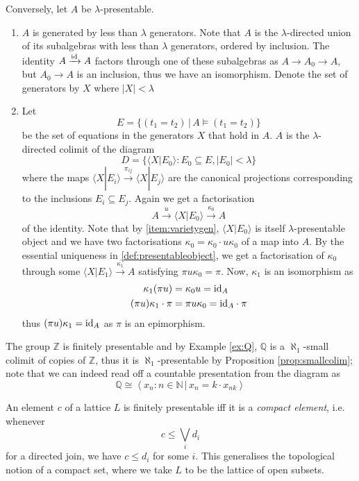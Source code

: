 Conversely, let $A$ be $\lambda$-presentable.
\begin{enumerate}
\item \label{item:varietygen} $A$ is generated by less than $\lambda$ generators. Note that $A$ is the $\lambda$-directed union of its subalgebras with less than $\lambda$ generators, ordered by inclusion. The identity $A \xrightarrow{\textrm{id}} A$ factors through one of these subalgebras as $A \to A_0 \to A$, but $A_0 \to A$ is an inclusion, thus we have an isomorphism. Denote the set of generators by $X$ where $|X| < \lambda$
\item Let \[ E = \{ (t_1 = t_2) \,|\, A \models (t_1 = t_2) \} \] be the set of equations in the generators $X$ that hold in $A$. $A$ is the $\lambda$-directed colimit of the diagram
\[ D = \{ \langle X|E_0\rangle : E_0 \subseteq E, |E_0| < \lambda \} \]
where the maps $\langle X|E_i\rangle \xrightarrow{\pi_{ij}} \langle X|E_j\rangle$ are the canonical projections corresponding to the inclusions $E_i \subseteq E_j$. Again we get a factorisation 
\[ A \xrightarrow{u} \langle X|E_0 \rangle \xrightarrow{\kappa_0} A \]
of the identity. Note that by \ref{item:varietygen}, $\langle X|E_0 \rangle$ is itself $\lambda$-presentable object and we have two factorisations $\kappa_0 = \kappa_0 \cdot u\kappa_0$ of a map into $A$. By the essential uniqueness in \ref{def:presentableobject}, we get a factorisation of $\kappa_0$ through some $\langle X|E_1 \rangle \xrightarrow{\kappa_1} A$ satisfying $\pi u \kappa_0 = \pi$. Now, $\kappa_1$ is an isomorphism as
\begin{align*}
\kappa_1 (\pi u) &= \kappa_0 u = \textrm{id}_A \\
(\pi u) \kappa_1 \cdot \pi &= \pi u \kappa_0 = \textrm{id}_A \cdot \pi
\end{align*}
thus $(\pi u) \kappa_1 = \textrm{id}_A$ as $\pi$ is an epimorphism.
\end{enumerate}

\begin{Example}
The group $\mathbb Z$ is finitely presentable and by Example \ref{ex:Q}, $\mathbb Q$ is a $\aleph_1$-small colimit of copies of $\mathbb Z$, thus it is $\aleph_1$-presentable by Proposition \ref{prop:smallcolim}; note that we can indeed read off a countable presentation from the diagram as
\[ \mathbb Q \cong \left\langle x_n : n \in \mathbb N\,|\,x_n = k \cdot x_{nk} \right \rangle\]
\end{Example}

\begin{Example}
An element $c$ of a lattice $L$ is finitely presentable iff it is a \emph{compact element}, i.e. whenever
\[ c \leq \bigvee_i d_i \]
for a directed join, we have $c \leq d_i$ for some $i$. This generalises the topological notion of a compact set, where we take $L$ to be the lattice of open subsets.
\end{Example}



